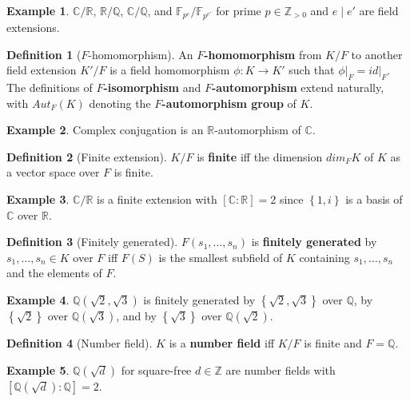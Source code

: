\documentclass{article}
\newcommand{\F}{\mathbb{F}}
\newcommand{\Z}{\mathbb{Z}}
\newcommand{\Q}{\mathbb{Q}}
\newcommand{\R}{\mathbb{R}}
\newcommand{\C}{\mathbb{C}}
\newcommand{\val}[1]{\left. #1 \right\rvert}
\newcommand{\rb}[1]{\left( #1 \right)}
\renewcommand{\sb}[1]{\left[ #1 \right]}
\newcommand{\cb}[1]{\left\{ #1 \right\}}
\theoremstyle{definition}
\newtheorem*{definition}{Definition}
\newtheorem*{example}{Example}
\begin{document}
\begin{example}
$ \C / \R $, $ \R / \Q $, $ \C / \Q $, and $ \F_{p^e} / \F_{p^{e'}} $ for prime $ p \in \Z_{> 0} $ and $ e \mid e' $ are field extensions.
\end{example}

\begin{definition}[$ F $-homomorphism]
An \textbf{$ F $-homomorphism} from $ K / F $ to another field extension $ K' / F $ is a field homomorphism $ \phi : K \to K' $ such that $ \val{\phi}_F = \val{id}_F $. The definitions of \textbf{$ F $-isomorphism} and \textbf{$ F $-automorphism} extend naturally, with $ Aut_F\rb{K} $ denoting the \textbf{$ F $-automorphism group} of $ K $.
\end{definition}

\begin{example}
Complex conjugation is an $ \R $-automorphism of $ \C $.
\end{example}

\begin{definition}[Finite extension]
$ K / F $ is \textbf{finite} iff the dimension $ dim_F K $ of $ K $ as a vector space over $ F $ is finite.
\end{definition}

\begin{example}
$ \C / \R $ is a finite extension with $ \sb{\C : \R} = 2 $ since $ \cb{1, i} $ is a basis of $ \C $ over $ \R $.
\end{example}

\begin{definition}[Finitely generated]
$ F\rb{s_1, \dots, s_n} $ is \textbf{finitely generated} by $ s_1, \dots, s_n \in K $ over $ F $ iff $ F\rb{S} $ is the smallest subfield of $ K $ containing $ s_1, \dots, s_n $ and the elements of $ F $.
\end{definition}

\begin{example}
$ \Q\rb{\sqrt{2}, \sqrt{3}} $ is finitely generated by $ \cb{\sqrt{2}, \sqrt{3}} $ over $ \Q $, by $ \cb{\sqrt{2}} $ over $ \Q\rb{\sqrt{3}} $, and by $ \cb{\sqrt{3}} $ over $ \Q\rb{\sqrt{2}} $.
\end{example}

\begin{definition}[Number field]
$ K $ is a \textbf{number field} iff $ K / F $ is finite and $ F = \Q $.
\end{definition}

\begin{example}
$ \Q\rb{\sqrt{d}} $ for square-free $ d \in \Z $ are number fields with $ \sb{\Q\rb{\sqrt{d}} : \Q} = 2 $.
\end{example}
\end{document}
